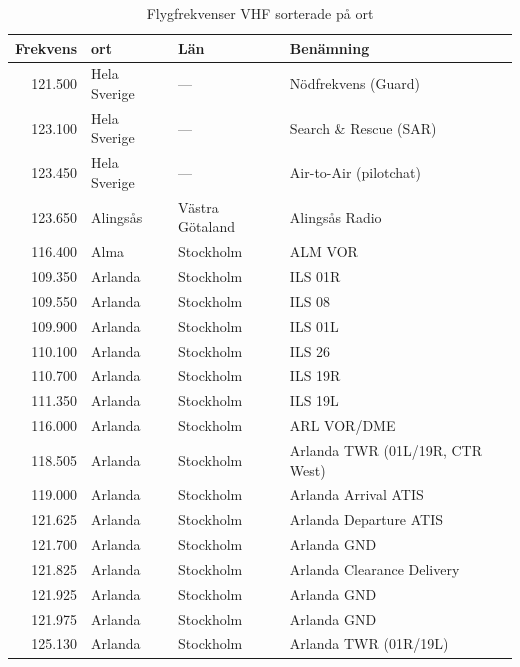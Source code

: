 \begin{longtable}{rlll}
  \caption{Flygfrekvenser VHF sorterade på ort}\\
  \textbf{Frekvens} & \textbf{ort} & \textbf{Län} & \textbf{Benämning} \\ \hline
  \endhead
  121.500 & Hela Sverige & ---             & Nödfrekvens (Guard)             \\
  123.100 & Hela Sverige & ---             & Search \& Rescue (SAR)          \\
  123.450 & Hela Sverige & ---             & Air-to-Air (pilotchat)          \\ \hline
  123.650 & Alingsås     & Västra Götaland & Alingsås Radio                  \\
  116.400 & Alma         & Stockholm       & ALM VOR                         \\
  109.350 & Arlanda      & Stockholm       & ILS 01R                         \\
  109.550 & Arlanda      & Stockholm       & ILS 08                          \\
  109.900 & Arlanda      & Stockholm       & ILS 01L                         \\
  110.100 & Arlanda      & Stockholm       & ILS 26                          \\
  110.700 & Arlanda      & Stockholm       & ILS 19R                         \\
  111.350 & Arlanda      & Stockholm       & ILS 19L                         \\
  116.000 & Arlanda      & Stockholm       & ARL VOR/DME                     \\
  118.505 & Arlanda      & Stockholm       & Arlanda TWR (01L/19R, CTR West) \\
  119.000 & Arlanda      & Stockholm       & Arlanda Arrival ATIS            \\
  121.625 & Arlanda      & Stockholm       & Arlanda Departure ATIS          \\
  121.700 & Arlanda      & Stockholm       & Arlanda GND                     \\
  121.825 & Arlanda      & Stockholm       & Arlanda Clearance Delivery      \\
  121.925 & Arlanda      & Stockholm       & Arlanda GND                     \\
  121.975 & Arlanda      & Stockholm       & Arlanda GND                     \\
  125.130 & Arlanda      & Stockholm       & Arlanda TWR (01R/19L)           \\

\end{longtable}

